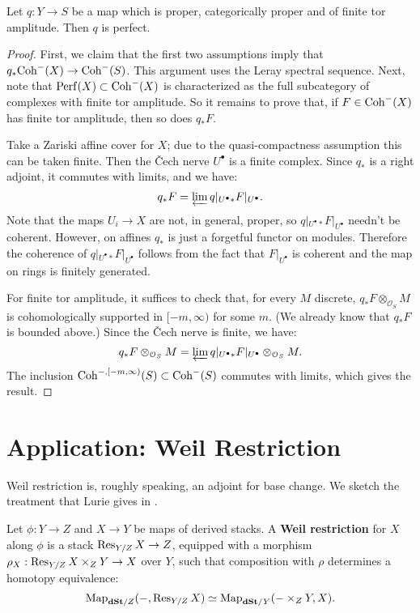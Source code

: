 \begin{lem}
\label{lem:q_perfect}
Let $q: Y \to S$ be a map which is proper, categorically proper and of finite tor amplitude. Then $q$ is perfect.
\end{lem}
\begin{proof}
First, we claim that the first two assumptions imply that $q_* \mathrm{Coh}^-(X) \to \mathrm{Coh}^-(S)$. This argument uses the Leray spectral
sequence.  Next, note that $\mathrm{Perf}(X) \subset \mathrm{Coh}^-(X)$ is characterized as the full subcategory of complexes
with finite tor amplitude. So it remains to prove that, if $F \in \mathrm{Coh}^-(X)$ has finite tor amplitude, then so does $q_*F$.

Take a Zariski affine cover for $X$; due to the quasi-compactness assumption this can be taken finite. Then the \v{C}ech nerve
$U^{\bullet}$ is a finite complex. Since $q_*$ is a right adjoint, it commutes with limits, and we have:
\[	q_* F = \varprojlim q|_{U^{\bullet}*} F|_{U^{\bullet}}.	\]
Note that the maps $U_i \to X$ are not, in general, proper, so $q|_{U^{\bullet}*} F|_{U^{\bullet}}$ needn't be coherent. However,
on affines $q_*$ is just a forgetful functor on modules. Therefore the coherence of $q|_{U^{\bullet}*} F|_{U^{\bullet}}$
follows from the fact that $F|_{U^{\bullet}}$ is coherent and the map on rings is finitely generated. 

For finite tor amplitude, it suffices to check that, for every $M$ discrete, $q_*F \otimes_{\mathcal{O}_S} M$ is cohomologically
supported in $[-m,\infty)$ for some $m$. (We already know that $q_*F$ is bounded above.) Since the \v{C}ech nerve is finite,
we have:
\[	q_*F \otimes_{\mathcal{O}_S} M = \varprojlim q|_{U^{\bullet}*} F|_{U^{\bullet}} \otimes_{\mathcal{O}_S} M.	\]
The inclusion $\mathrm{Coh}^{-,[-m,\infty)}(S) \subset \mathrm{Coh}^-(S)$ commutes with limits, which gives the result.
\end{proof}




\section{Application: Weil Restriction}
Weil restriction is, roughly speaking, an adjoint for base change. We sketch the treatment that Lurie gives in \cite{DAG-XIV}.

\begin{defin}
Let $\phi : Y \to Z$ and $X \to Y$ be maps of derived stacks. A \textbf{Weil restriction} for $X$ along $\phi$ is a
stack $\operatorname{Res}_{Y/Z}X \to Z$, equipped with a morphism $\rho_X : \operatorname{Res}_{Y/Z}X \times_Z Y \to X$ over $Y$, such that composition
with $\rho$ determines a homotopy equivalence:
\begin{equation}
\label{eq:weil_restriction}
	\operatorname{Map}_{\mathbf{dSt}/Z}( - , \operatorname{Res}_{Y/Z}X) \simeq \operatorname{Map}_{\mathbf{dSt}/Y}(- \times_Z Y, X).
\end{equation}
\end{defin}

